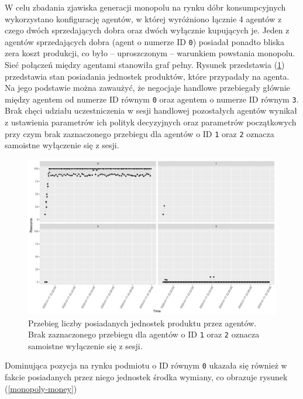 \documentclass{article}
\begin{document}
W celu zbadania zjawiska generacji monopolu na rynku dóbr konsumpcyjnych wykorzystano konfigurację agentów, w której wyróżniono łącznie 4 agentów z czego dwóch sprzedających dobra oraz dwóch wyłącznie kupujących je. 
Jeden z agentów sprzedających dobra (agent o numerze ID \texttt{0}) posiadał ponadto bliska zera koszt produkcji, co było -- uproszczonym -- warunkiem powstania monopolu. \\
Sieć połączeń między agentami stanowiła graf pełny. Rysunek przedstawia (\ref{monopoly-resource}) przedstawia stan posiadania jednostek produktów, które przypadały na agenta. Na jego podstawie można zawaużyć, że negocjaje handlowe przebiegały głównie między agentem od numerze ID równym \texttt{0} oraz agentem o numerze ID równym \texttt{3}. Brak chęci udziału uczestniczenia w sesji handlowej pozostałych agentów wynikał z ustawienia parametrów ich polityk decyzyjnych oraz parametrów początkowych przy czym brak zaznaczonego przebiegu dla agentów o ID \texttt{1} oraz \texttt{2} oznacza samoistne wyłączenie się z sesji.

\begin{figure}[H]
	\centering
	\includegraphics[width=\textwidth]{./monopoly-resource.png}
	\caption{Przebieg liczby posiadanych jednostek produktu przez agentów. Brak zaznaczonego przebiegu dla agentów o ID \texttt{1} oraz \texttt{2} oznacza samoistne wyłączenie się z sesji.}
	\label{monopoly-resource}
\end{figure}

Dominująca pozycja na rynku podmiotu o ID równym \texttt{0} ukazała się również w fakcie posiadanych przez niego jednostek środka wymiany, co obrazuje rysunek (\ref{monopoly-money})
\end{document}
